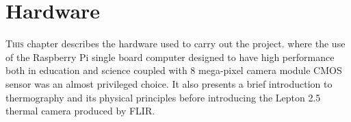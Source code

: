 \chapter{Hardware}
\label{chap:hardware}
\lettrine[lines=3]{T}{his} chapter describes the hardware used to carry out the
project. where the use of the Raspberry Pi single board computer designed to
have high performance both in education and science coupled with 8 mega-pixel
camera module CMOS sensor was an almost privileged choice. It also presents a
brief introduction to thermography and its physical principles before
introducing the Lepton 2.5 thermal camera produced by FLIR.
%

